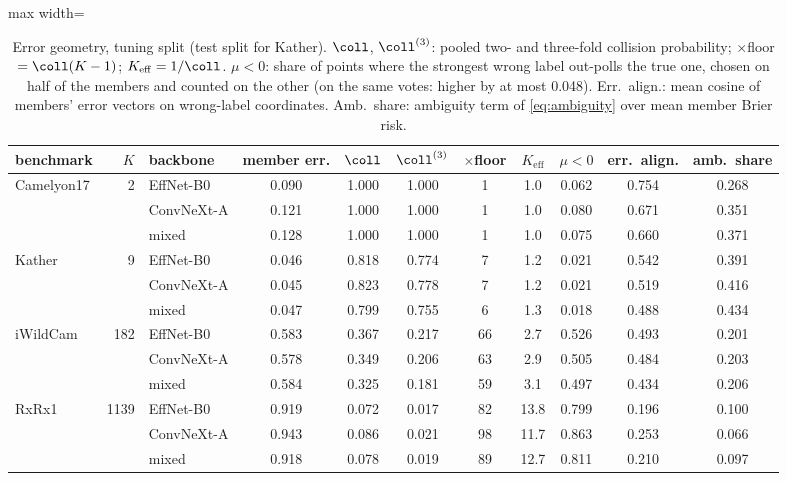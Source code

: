 \begin{table}[t]
\centering
\footnotesize
\caption{Error geometry, tuning split (test split for Kather). $\coll$, $\coll^{(3)}$: pooled two- and three-fold collision probability; $\times$floor $=\coll(K-1)$; $K_{\mathrm{eff}}=1/\coll$. $\mu<0$: share of points where the strongest wrong label out-polls the true one, chosen on half of the members and counted on the other (on the same votes: higher by at most 0.048). Err.\ align.: mean cosine of members' error vectors on wrong-label coordinates. Amb.\ share: ambiguity term of \eqref{eq:ambiguity} over mean member Brier risk.}
\label{tab:geometry}
\setlength{\tabcolsep}{3pt}\begin{adjustbox}{max width=\linewidth}
\begin{tabular}{lrlcccccccc}
\toprule
benchmark & $K$ & backbone & member err. & $\coll$ & $\coll^{(3)}$ & $\times$floor & $K_{\mathrm{eff}}$ & $\mu<0$ & err.\ align. & amb.\ share \\
\midrule
Camelyon17 & 2 & EffNet-B0 & 0.090 & 1.000 & 1.000 & 1 & 1.0 & 0.062 & 0.754 & 0.268 \\
 &  & ConvNeXt-A & 0.121 & 1.000 & 1.000 & 1 & 1.0 & 0.080 & 0.671 & 0.351 \\
 &  & mixed & 0.128 & 1.000 & 1.000 & 1 & 1.0 & 0.075 & 0.660 & 0.371 \\
\addlinespace
Kather & 9 & EffNet-B0 & 0.046 & 0.818 & 0.774 & 7 & 1.2 & 0.021 & 0.542 & 0.391 \\
 &  & ConvNeXt-A & 0.045 & 0.823 & 0.778 & 7 & 1.2 & 0.021 & 0.519 & 0.416 \\
 &  & mixed & 0.047 & 0.799 & 0.755 & 6 & 1.3 & 0.018 & 0.488 & 0.434 \\
\addlinespace
iWildCam & 182 & EffNet-B0 & 0.583 & 0.367 & 0.217 & 66 & 2.7 & 0.526 & 0.493 & 0.201 \\
 &  & ConvNeXt-A & 0.578 & 0.349 & 0.206 & 63 & 2.9 & 0.505 & 0.484 & 0.203 \\
 &  & mixed & 0.584 & 0.325 & 0.181 & 59 & 3.1 & 0.497 & 0.434 & 0.206 \\
\addlinespace
RxRx1 & 1139 & EffNet-B0 & 0.919 & 0.072 & 0.017 & 82 & 13.8 & 0.799 & 0.196 & 0.100 \\
 &  & ConvNeXt-A & 0.943 & 0.086 & 0.021 & 98 & 11.7 & 0.863 & 0.253 & 0.066 \\
 &  & mixed & 0.918 & 0.078 & 0.019 & 89 & 12.7 & 0.811 & 0.210 & 0.097 \\
\bottomrule
\end{tabular}
\end{adjustbox}
\end{table}
